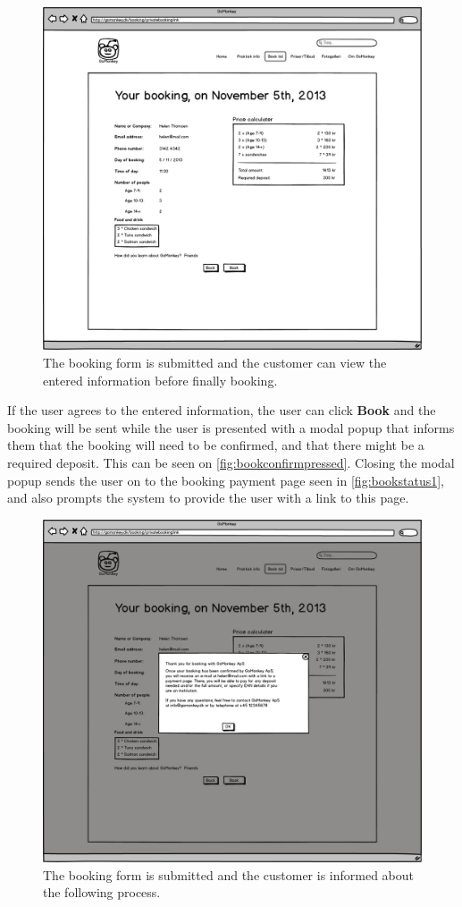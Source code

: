 \begin{figure}[htbp]
    \centering
        \includegraphics[width=.6\textwidth]{figures/mockup/booking_confirmation.png}
	    \caption{The booking form is submitted and the customer can view the entered information before finally booking.}
        \label{fig:bookconfirm}
\end{figure}

If the user agrees to the entered information, the
user can click \textbf{Book} and the booking will be sent while the user is presented
with a modal popup that informs them that the booking will need to be confirmed,
and that there might be a required deposit. This can be seen on \autoref{fig:bookconfirmpressed}.
Closing the modal popup sends the user on to the booking payment page seen in
\autoref{fig:bookstatus1}, and also prompts the system to provide the user with
a link to this page.

\begin{figure}[htbp]
    \centering
        \includegraphics[width=.6\textwidth]{figures/mockup/booking_confirmation_bookpressed.png}
	    \caption{The booking form is submitted and the customer is informed about the following process.}
        \label{fig:bookconfirmpressed}
\end{figure}

